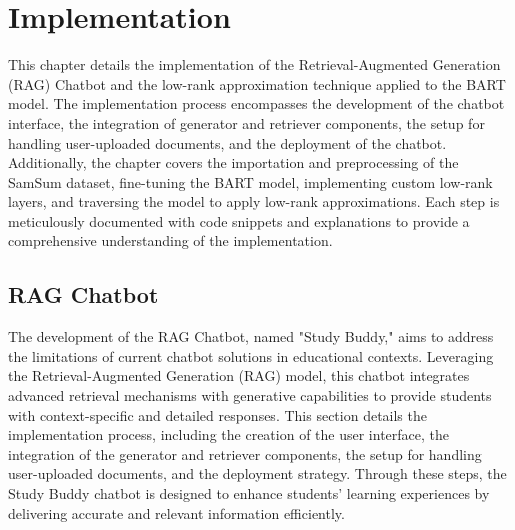 \chapter{Implementation}\label{chap:implementation}
This chapter details the implementation of the Retrieval-Augmented Generation (RAG) Chatbot and the low-rank approximation technique applied to the BART model. The implementation process encompasses the development of the chatbot interface, the integration of generator and retriever components, the setup for handling user-uploaded documents, and the deployment of the chatbot. Additionally, the chapter covers the importation and preprocessing of the SamSum dataset, fine-tuning the BART model, implementing custom low-rank layers, and traversing the model to apply low-rank approximations. Each step is meticulously documented with code snippets and explanations to provide a comprehensive understanding of the implementation.
\section{RAG Chatbot}
The development of the RAG Chatbot, named "Study Buddy," aims to address the limitations of current chatbot solutions in educational contexts. Leveraging the Retrieval-Augmented Generation (RAG) model, this chatbot integrates advanced retrieval mechanisms with generative capabilities to provide students with context-specific and detailed responses. This section details the implementation process, including the creation of the user interface, the integration of the generator and retriever components, the setup for handling user-uploaded documents, and the deployment strategy. Through these steps, the Study Buddy chatbot is designed to enhance students' learning experiences by delivering accurate and relevant information efficiently.
